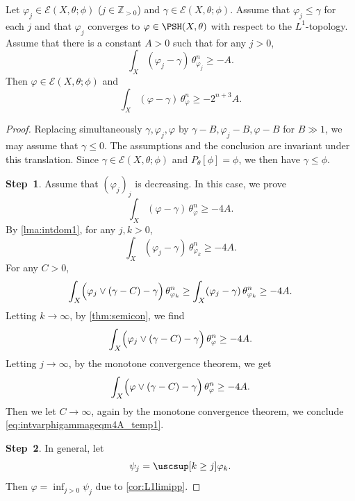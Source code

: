 \begin{lemma}\label{lma:stab}
	Let $\varphi_j\in \mathcal{E}(X,\theta;\phi)$ ($j\in \mathbb{Z}_{>0}$) and $\gamma\in \mathcal{E}(X,\theta;\phi)$. Assume that $\varphi_j\leq \gamma$ for each $j$ and that $\varphi_j$ converges to $\varphi\in \PSH(X,\theta)$ with respect to the $L^1$-topology.
	Assume that there is a constant $A>0$ such that for any $j>0$,
	\[
	\int_X (\varphi_j-\gamma)\,\theta_{\varphi_j}^n\geq -A.
	\]
	Then $\varphi\in \mathcal{E}(X,\theta;\phi)$ and
	\begin{equation}\label{eq:intvarphigammageqm2np3A}
	    \int_X (\varphi-\gamma)\,\theta_{\varphi}^n\geq - 2^{n+3}A.
	\end{equation}
\end{lemma}
\begin{proof}
    Replacing simultaneously $\gamma,\varphi_j,\varphi$ by $\gamma-B,\varphi_j-B,\varphi-B$ for $B\gg 1$, we may assume that $\gamma\leq 0$. The assumptions and the conclusion are invariant under this translation. Since $\gamma\in\mathcal E(X,\theta;\phi)$ and $P_\theta[\phi]=\phi$, we then have $\gamma\leq\phi$.

	\textbf{Step~1}. Assume that $(\varphi_j)_j$ is decreasing. In this case, we prove
	\begin{equation}\label{eq:intvarphigammageqm4A_temp1}
	\int_X (\varphi-\gamma)\,\theta_{\varphi}^n\geq -4A.
    \end{equation}
	By \cref{lma:intdom1}, for any $j, k>0$,
	\[
	\int_X (\varphi_j-\gamma)\,\theta_{\varphi_k}^n\geq -4A.
	\]
	For any $C>0$,
	\[
	\int_X \Bigl(\varphi_j \lor (\gamma-C)-\gamma\Bigr)\,\theta_{\varphi_k}^n\geq \int_X (\varphi_j-\gamma) \,\theta_{\varphi_k}^n\geq -4A.
	\]
	Letting $k\to \infty$, by \cref{thm:semicon}, we find
	\[
	\int_X \Bigl(\varphi_j \lor (\gamma-C)-\gamma\Bigr)\,\theta_{\varphi}^n\geq -4A.
	\]
	Letting $j\to \infty$, by the monotone convergence theorem, we get
	\[
	\int_X \Bigl(\varphi \lor (\gamma-C)-\gamma\Bigr)\,\theta_{\varphi}^n\geq -4A.
	\]
	Then we let $C\to \infty$, again by the monotone convergence theorem, we conclude \eqref{eq:intvarphigammageqm4A_temp1}.

	\textbf{Step~2}. In general, let
    \[
    \psi_j=\uscsup[k\geq j] \varphi_k.
    \]
    Then $\varphi=\inf_{j>0}\psi_j$ due to \cref{cor:L1limipp}.


\end{proof}
